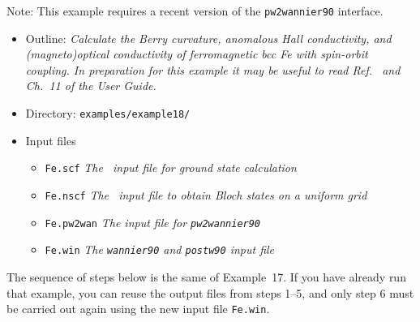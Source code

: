 \documentclass[a4paper,11pt,twoside]{article}
\begin{document}
\begin{itemize}
\end{itemize}



Note: This example requires a recent version of the {\tt pw2wannier90} interface.

\begin{itemize}
\item{Outline: \it{Calculate the Berry curvature, anomalous Hall
      conductivity, and (magneto)optical conductivity of ferromagnetic
      bcc Fe with spin-orbit coupling. In preparation for this example
      it may be useful to read Ref.~\cite{yao-prl04} and Ch.~11 of the
      User Guide.}}
\item{Directory: {\tt examples/example18/}}
\item{Input files}
\begin{itemize}
\item{ {\tt Fe.scf} {\it The \pwscf\ input file for ground state
    calculation}}
\item{ {\tt Fe.nscf}  {\it The \pwscf\ input file to obtain Bloch
    states on a uniform grid}} 
\item{ {\tt Fe.pw2wan}  {\it The input file for {\tt pw2wannier90}}}
\item{ {\tt Fe.win}  {\it The {\tt wannier90} and {\tt postw90} input file}}
\end{itemize}
\end{itemize}

The sequence of steps below is the same of Example~17.  If you have
already run that example, you can reuse the output files from steps
1--5, and only step 6 must be carried out again using the new input
file {\tt Fe.win}.
\end{document}
